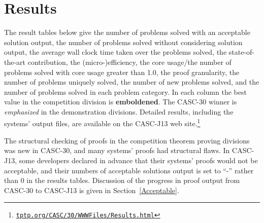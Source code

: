 \documentclass[aic]{iosart2x}
\newcommand{\LAST}{\mbox{CASC-30}}
\newcommand{\THIS}{\mbox{CASC-J13}}
\begin{document}

\section{Results}
\label{Results}

The result tables below give 
the number of problems solved with an acceptable solution output,
the number of problems solved without considering solution output,
the average wall clock time taken over the problems solved,
the state-of-the-art contribution,
the (micro-)\allowbreak efficiency,
the core usage/the number of problems solved with core usage greater than 1.0,
the proof granularity,
the number of problems uniquely solved,
the number of new problems solved,
and
the number of problems solved in each problem category.
In each column the best value in the competition division is {\bf emboldened}.
The \LAST{} winner is \textit{emphasized} in the demonstration divisions.
Detailed results, including the systems' output files, are available on the \THIS{} web 
site.\footnote{%
\href{https://tptp.org/CASC/J13/WWWFiles/Results.html}{\tt tptp.org/CASC/30/WWWFiles/Results.html}}

The structural checking of proofs in the competition theorem proving divisions was new in \LAST{}, 
and many systems' proofs had structural flaws.
In \THIS{}, some developers declared in advance that their systems' proofs would not be acceptable, 
and their numbers of acceptable solutions output is set to ``-'' rather than 0 in the results 
tables.
Discussion of the progress in proof output from \LAST{} to \THIS{} is given in 
Section~\ref{Acceptable}.
\end{document}

